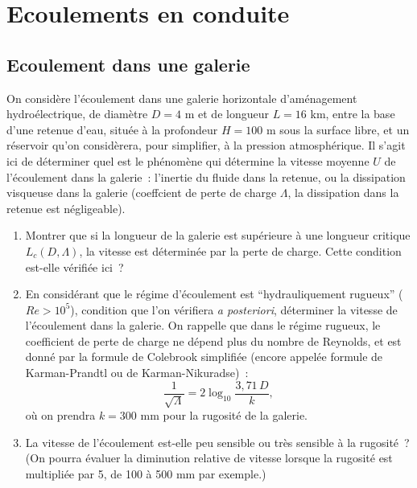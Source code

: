 
\section{Ecoulements en conduite}





\subsection{Ecoulement dans une galerie}

On consid\`ere l'\'ecoulement dans une galerie horizontale d'am\'enagement hydro\'electrique, de diam\`etre $D = 4$ m et de longueur $L = 16$ km, entre la base d'une retenue d'eau, situ\'ee \`a la profondeur $H = 100$ m sous la surface libre, et un r\'eservoir qu'on consid\`erera, pour simplifier, \`a la pression atmosph\'erique. Il s'agit ici de d\'eterminer quel est le ph\'enom\`ene qui d\'etermine la vitesse moyenne $U$ de l'\'ecoulement dans la galerie~: l'inertie du fluide dans la retenue, ou la dissipation visqueuse dans la galerie (coeffcient de perte de charge $\Lambda$, la dissipation dans la retenue est n\'egligeable).

\begin{enumerate}
\item Montrer que si la longueur de la galerie est sup\'erieure \`a une longueur critique $L_c(D, \Lambda)$, la vitesse est d\'etermin\'ee par la perte de charge. Cette condition est-elle v\'erifi\'ee ici~? 
\item En consid\'erant que le r\'egime d'\'ecoulement est ``hydrauliquement rugueux'' ($Re > 10^5$), condition que l'on v\'erifiera {\it a posteriori}, d\'eterminer la vitesse de l'\'ecoulement dans la galerie. On rappelle que dans le r\'egime rugueux, le coefficient de perte de charge ne d\'epend plus du nombre de Reynolds, et est donn\'e par la formule de Colebrook simplifi\'ee (encore appel\'ee formule de Karman-Prandtl ou de Karman-Nikuradse)~:
$$
\frac{1}{\sqrt{\Lambda}} = 2 \log_{10} \frac{3,71 \, D}{k},
$$
o\`u on prendra $k = 300$ mm pour la rugosit\'e de la galerie. 
\item La vitesse de l'\'ecoulement est-elle peu sensible ou tr\`es sensible \`a la rugosit\'e~? (On pourra \'evaluer la diminution relative de vitesse lorsque la rugosit\'e est multipli\'ee par 5, de 100 \`a 500 mm par exemple.)
\end{enumerate}

